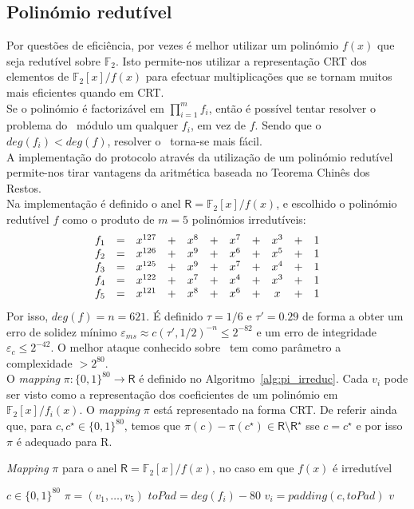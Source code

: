 \subsection{Polinómio redutível}
Por questões de eficiência, por vezes é melhor utilizar um polinómio $f(x)$ que seja redutível sobre $\mathbb{F}_2$. Isto permite-nos utilizar a representação CRT dos elementos de $\mathbb{F}_2[x]/f(x)$ para efectuar multiplicações que se tornam muitos mais eficientes quando em CRT.\\
Se o polinómio é factorizável em $\prod_{i=1}^{m} f_i$, então é possível tentar resolver o problema do \RingLPN\ módulo um qualquer $f_i$, em vez de $f$. Sendo que o $deg(f_i) < deg(f)$, resolver o \RingLPN\ torna-se mais fácil.\\
A implementação do protocolo através da utilização de um polinómio redutível permite-nos tirar vantagens da aritmética baseada no Teorema Chinês dos Restos.\\
Na implementação é definido o anel $\mathsf{R} = \mathbb{F}_2[x]/f(x)$, e escolhido o polinómio redutível $f$ como o produto de $m = 5$ polinómios irredutíveis:
$$
\begin{array}{c c c c c c c c c c c}
  f_1 &=& x^{127} &+& x^{8} &+& x^{7} &+& x^{3} &+& 1 \\
  f_2 &=& x^{126} &+& x^{9} &+& x^{6} &+& x^{5} &+& 1 \\
  f_3 &=& x^{125} &+& x^{9} &+& x^{7} &+& x^{4} &+& 1 \\
  f_4 &=& x^{122} &+& x^{7} &+& x^{4} &+& x^{3} &+& 1 \\
  f_5 &=& x^{121} &+& x^{8} &+& x^{6} &+& x     &+& 1 \\
\end{array}
$$
Por isso, $deg(f) = n = 621$. É definido $\tau = 1/6$ e $\tau' = 0.29$ de forma a obter um erro de solidez mínimo $\varepsilon_{ms} \approx c(\tau', 1/2)^{-n} \le 2^{-82}$ e um erro de integridade $\varepsilon_{c} \le 2^{-42}$. O melhor ataque conhecido sobre \RingLPNRtau\ tem como parâmetro a complexidade $>2^{80}$.\\
O \textit{mapping} $\pi : \{0,1\}^{80} \rightarrow \mathsf{R}$ é definido no Algoritmo~\ref{alg:pi_irreduc}. Cada $v_i$ pode ser visto como a representação dos coeficientes de um polinómio em $\mathbb{F}_2[x]/f_i(x)$. O \textit{mapping} $\pi$ está representado na forma CRT. De referir ainda que, para $c, c^\star \in \{0,1\}^{80}$, temos que $\pi(c) - \pi(c^\star) \in \mathsf{R} \setminus \mathsf{R}^\star$ sse $c = c^\star$ e por isso $\pi$ é adequado para \textsf{R}.\\
\begin{algorithm}
  \caption{\textit{Mapping} $\pi$ para o anel $\mathsf{R} = \mathbb{F}_2[x]/f(x)$, no caso em que $f(x)$ é irredutível}\label{alg:pi_irreduc}

  \begin{algorithmic}
    \Require $c \in \{0, 1\}^{80}$
    \Ensure $\pi = (v_1, \dotsc, v_5)$
    \State    $toPad = deg(f_i) - 80$
    \State    $v_i = padding(c, toPad)$
    \EndFor 
    \State \Return $v$
  \end{algorithmic}
\end{algorithm}
